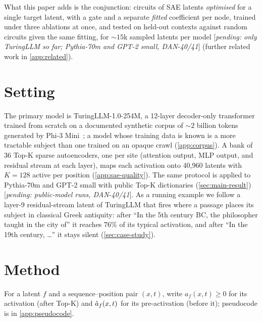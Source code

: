 \documentclass[10pt]{article}
\newcommand{\pending}[1]{\textcolor{red!70!black}{[\textit{pending: #1}]}}
\begin{document}
What this paper adds is the conjunction: circuits of SAE latents \emph{optimised} for a single target latent, with a gate and a separate \emph{fitted} coefficient per node, trained under three ablations at once, and tested on held-out contexts against random circuits given the same fitting, for ${\sim}15$k sampled latents per model \pending{only TuringLLM so far; Pythia-70m and GPT-2 small, DAN-40/41} (further related work in \cref{app:related}).

\section{Setting}
\label{sec:setting}

The primary model is TuringLLM-1.0-254M, a 12-layer decoder-only transformer trained from scratch on a documented synthetic corpus of ${\sim}2$ billion tokens generated by Phi-3 Mini~\citep{abdin2024phi3}; a model whose training data is known is a more tractable subject than one trained on an opaque crawl (\cref{app:corpus}).
A bank of 36 Top-K sparse autoencoders, one per site (attention output, MLP output, and residual stream at each layer), maps each activation onto 40{,}960 latents with $K = 128$ active per position (\cref{app:sae-quality}).
The same protocol is applied to Pythia-70m and GPT-2 small with public Top-K dictionaries (\cref{sec:main-result}) \pending{public-model runs, DAN-40/41}.
As a running example we follow a layer-9 residual-stream latent of TuringLLM that fires where a passage places its subject in classical Greek antiquity: after ``In the 5th century BC, the philosopher taught in the city of'' it reaches $76\%$ of its typical activation, and after ``In the 19th century, \ldots'' it stays silent (\cref{sec:case-study}).

\section{Method}
\label{sec:method}

For a latent $f$ and a sequence--position pair $(x, t)$, write $a_f(x, t) \geq 0$ for its activation (after Top-K) and $\hat{a}_f(x, t)$ for its pre-activation (before it); pseudocode is in \cref{app:pseudocode}.
\end{document}
